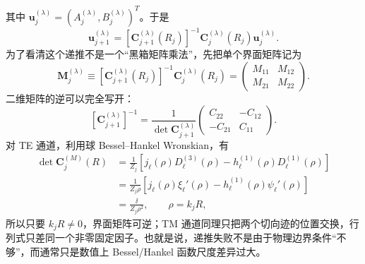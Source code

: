 其中
$\bm u_j^{(\lambda)}=(A_j^{(\lambda)},B_j^{(\lambda)})^T$。于是
\begin{equation}
\bm u_{j+1}^{(\lambda)}
=
\left[\mathbf C_{j+1}^{(\lambda)}(R_j)\right]^{-1}
\mathbf C_j^{(\lambda)}(R_j)
\bm u_j^{(\lambda)}.
\label{eq:multilayer-transfer-step}
\end{equation}
为了看清这个递推不是一个“黑箱矩阵乘法”，先把单个界面矩阵记为
\begin{equation}
\mathbf M_j^{(\lambda)}
\equiv
\left[\mathbf C_{j+1}^{(\lambda)}(R_j)\right]^{-1}
\mathbf C_j^{(\lambda)}(R_j)
=\begin{pmatrix}
M_{11}&M_{12}\\M_{21}&M_{22}
\end{pmatrix}.
\label{eq:multilayer-interface-M}
\end{equation}
二维矩阵的逆可以完全写开：
\begin{equation}
\left[\mathbf C_{j+1}^{(\lambda)}\right]^{-1}
=\frac{1}{\det\mathbf C_{j+1}^{(\lambda)}}
\begin{pmatrix}
C_{22}&-C_{12}\\-C_{21}&C_{11}
\end{pmatrix}.
\end{equation}
对 TE 通道，利用球 Bessel--Hankel Wronskian，有
\begin{align}
\det\mathbf C_j^{(M)}(R)
&=\frac{1}{Z_j}
\left[
 j_\ell(\rho)D_\ell^{(3)}(\rho)
-h_\ell^{(1)}(\rho)D_\ell^{(1)}(\rho)
\right]\\
&=\frac{1}{Z_j\rho}
\left[j_\ell(\rho)\xi_\ell'(\rho)
-h_\ell^{(1)}(\rho)\psi_\ell'(\rho)\right]\\
&=\frac{\ii}{Z_j\rho^2},
\qquad \rho=k_jR,
\label{eq:multilayer-det-M}
\end{align}
所以只要 $k_jR\neq0$，界面矩阵可逆；TM 通道同理只把两个切向迹的位置交换，行列式只差同一个非零固定因子。也就是说，递推失败不是由于物理边界条件“不够”，而通常只是数值上 Bessel/Hankel 函数尺度差异过大。

